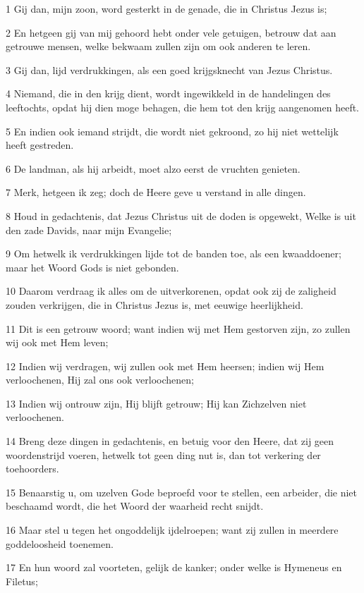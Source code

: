 \par 1 Gij dan, mijn zoon, word gesterkt in de genade, die in Christus Jezus is;
\par 2 En hetgeen gij van mij gehoord hebt onder vele getuigen, betrouw dat aan getrouwe mensen, welke bekwaam zullen zijn om ook anderen te leren.
\par 3 Gij dan, lijd verdrukkingen, als een goed krijgsknecht van Jezus Christus.
\par 4 Niemand, die in den krijg dient, wordt ingewikkeld in de handelingen des leeftochts, opdat hij dien moge behagen, die hem tot den krijg aangenomen heeft.
\par 5 En indien ook iemand strijdt, die wordt niet gekroond, zo hij niet wettelijk heeft gestreden.
\par 6 De landman, als hij arbeidt, moet alzo eerst de vruchten genieten.
\par 7 Merk, hetgeen ik zeg; doch de Heere geve u verstand in alle dingen.
\par 8 Houd in gedachtenis, dat Jezus Christus uit de doden is opgewekt, Welke is uit den zade Davids, naar mijn Evangelie;
\par 9 Om hetwelk ik verdrukkingen lijde tot de banden toe, als een kwaaddoener; maar het Woord Gods is niet gebonden.
\par 10 Daarom verdraag ik alles om de uitverkorenen, opdat ook zij de zaligheid zouden verkrijgen, die in Christus Jezus is, met eeuwige heerlijkheid.
\par 11 Dit is een getrouw woord; want indien wij met Hem gestorven zijn, zo zullen wij ook met Hem leven;
\par 12 Indien wij verdragen, wij zullen ook met Hem heersen; indien wij Hem verloochenen, Hij zal ons ook verloochenen;
\par 13 Indien wij ontrouw zijn, Hij blijft getrouw; Hij kan Zichzelven niet verloochenen.
\par 14 Breng deze dingen in gedachtenis, en betuig voor den Heere, dat zij geen woordenstrijd voeren, hetwelk tot geen ding nut is, dan tot verkering der toehoorders.
\par 15 Benaarstig u, om uzelven Gode beproefd voor te stellen, een arbeider, die niet beschaamd wordt, die het Woord der waarheid recht snijdt.
\par 16 Maar stel u tegen het ongoddelijk ijdelroepen; want zij zullen in meerdere goddeloosheid toenemen.
\par 17 En hun woord zal voorteten, gelijk de kanker; onder welke is Hymeneus en Filetus;

